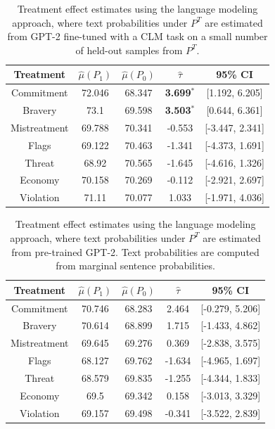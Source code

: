 \documentclass{article}
\begin{document}
\begin{table}[!ht]
    \centering
    \begin{tabular}{c|cccc}
        \toprule
        Treatment & $\hat{\mu}(P_1)$ & $\hat{\mu}(P_0)$ & $\hat{\tau}$ & 95\% CI \\
        \midrule
        Commitment & 72.046 & 68.347 & \textbf{\textcolor{green!50!black}{3.699$^*$}} & [1.192, 6.205] \\
        Bravery & 73.1 & 69.598 & \textbf{\textcolor{green!50!black}{3.503$^*$}} & [0.644, 6.361] \\
        Mistreatment & 69.788 & 70.341 & \textcolor{red!80!black}{-0.553} & [-3.447, 2.341] \\
        Flags & 69.122 & 70.463 & \textcolor{red!80!black}{-1.341} & [-4.373, 1.691] \\
        Threat & 68.92 & 70.565 & \textcolor{red!80!black}{-1.645} & [-4.616, 1.326] \\
        Economy & 70.158 & 70.269 & \textcolor{red!80!black}{-0.112} & [-2.921, 2.697] \\
        Violation & 71.11 & 70.077 & \textcolor{green!50!black}{1.033} & [-1.971, 4.036] \\
        \bottomrule
    \end{tabular}
    \caption{Treatment effect estimates using the language modeling approach, where text probabilities under $P^T$ are estimated from GPT-2 fine-tuned with a CLM task on a small number of held-out samples from $P^T$.}
    \label{tab:results_clm_gpt2_finetuned}
\end{table}

\begin{table}[!ht]
    \centering
    \begin{tabular}{c|cccc}
        \toprule
        Treatment & $\hat{\mu}(P_1)$ & $\hat{\mu}(P_0)$ & $\hat{\tau}$ & 95\% CI \\
        \midrule
        Commitment & 70.746 & 68.283 & \textcolor{green!50!black}{2.464} & [-0.279, 5.206] \\
        Bravery & 70.614 & 68.899 & \textcolor{green!50!black}{1.715} & [-1.433, 4.862] \\
        Mistreatment & 69.645 & 69.276 & \textcolor{green!50!black}{0.369} & [-2.838, 3.575] \\
        Flags & 68.127 & 69.762 & \textcolor{red!80!black}{-1.634} & [-4.965, 1.697] \\
        Threat & 68.579 & 69.835 & \textcolor{red!80!black}{-1.255} & [-4.344, 1.833] \\
        Economy & 69.5 & 69.342 & \textcolor{green!50!black}{0.158} & [-3.013, 3.329]  \\
        Violation & 69.157 & 69.498 & \textcolor{red!80!black}{-0.341} & [-3.522, 2.839] \\
        \bottomrule
    \end{tabular}
    \caption{Treatment effect estimates using the language modeling approach, where text probabilities under $P^T$ are estimated from pre-trained GPT-2. Text probabilities are computed from marginal sentence probabilities.}
    \label{tab:results_clm_gpt2_marginal}
\end{table}
\end{document}

